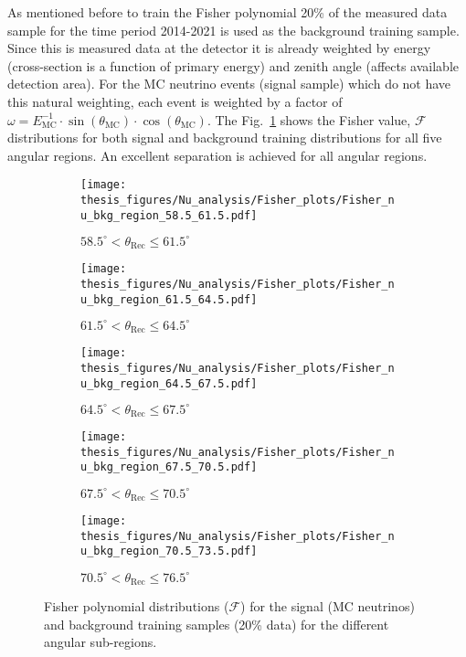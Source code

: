 As mentioned before to train the Fisher polynomial 20\% of the measured data sample for the time period 2014-2021 is used as the background training sample. Since this is measured data at the detector it is already weighted by energy (cross-section is a function of primary energy) and zenith angle (affects available detection area). For the MC neutrino events (signal sample) which do not have this natural weighting, each event is weighted by a factor of $\omega = E_{\text{MC}}^{-1} \cdot \sin(\theta_{\text{MC}}) \cdot \cos(\theta_{\text{MC}})$. The Fig.~\ref{fig:Fisher_dists} shows the Fisher value, $\mathcal{F}$ distributions for both signal and background training distributions for all five angular regions. An excellent separation is achieved for all angular regions. 

\begin{figure}[h!]
  \centering
   \begin{subfigure}[l]{.48\textwidth}
     \centering
     \texttt{[image: thesis\_figures/Nu\_analysis/Fisher\_plots/Fisher\_nu\_bkg\_region\_58.5\_61.5.pdf]}
     \caption{$ 58.5^{\circ} <\theta_{\text{Rec}} \leq 61.5^{\circ}$ }
   \end{subfigure}
   \begin{subfigure}[r]{.48\textwidth}
     \centering
     \texttt{[image: thesis\_figures/Nu\_analysis/Fisher\_plots/Fisher\_nu\_bkg\_region\_61.5\_64.5.pdf]}
     \caption{$61.5^{\circ} <\theta_{\text{Rec}} \leq 64.5^{\circ}$}
    \end{subfigure}
    \hfill
    \begin{subfigure}[l]{.48\textwidth}
      \centering
      \texttt{[image: thesis\_figures/Nu\_analysis/Fisher\_plots/Fisher\_nu\_bkg\_region\_64.5\_67.5.pdf]}
      \caption{$ 64.5^{\circ} <\theta_{\text{Rec}} \leq 67.5^{\circ}$}
    \end{subfigure}

    \begin{subfigure}[r]{.48\textwidth}
      \centering
      \texttt{[image: thesis\_figures/Nu\_analysis/Fisher\_plots/Fisher\_nu\_bkg\_region\_67.5\_70.5.pdf]}
      \caption{$ 67.5^{\circ} <\theta_{\text{Rec}} \leq 70.5^{\circ}$}
    \end{subfigure}
    \hfill    
    \begin{subfigure}[r]{.48\textwidth}
      \centering
      \texttt{[image: thesis\_figures/Nu\_analysis/Fisher\_plots/Fisher\_nu\_bkg\_region\_70.5\_73.5.pdf]}
      \caption{$ 70.5^{\circ} <\theta_{\text{Rec}} \leq 76.5^{\circ}$}
   \end{subfigure}
   \caption{Fisher polynomial distributions ($\mathcal{F}$) for the signal (MC neutrinos) and background training samples (20\% data) for the different angular sub-regions.}
    \label{fig:Fisher_dists}

\end{figure}
\FloatBarrier
\clearpage
